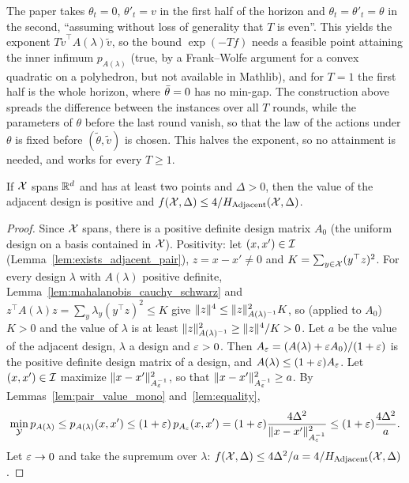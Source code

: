 \begin{remark}
  \label{rem:opt_lower_route}
  The paper takes $\theta_t = 0$, $\theta'_t = v$ in the first half of the horizon and
  $\theta_t = \theta'_t = \theta$ in the second, ``assuming without loss of generality that $T$ is
  even''. This yields the exponent $T \tilde v^\top A(\lambda) \tilde v$, so the bound
  $\exp(-T f)$ needs a feasible point attaining the inner infimum $p_{A(\lambda)}$ (true, by a
  Frank--Wolfe argument for a convex quadratic on a polyhedron, but not available in Mathlib), and
  for $T = 1$ the first half is the whole horizon, where $\bar{\theta} = 0$ has no min-gap. The
  construction above spreads the difference between the instances over all $T$ rounds, while the
  parameters of $\theta$ before the last round vanish, so that the law of the actions under
  $\theta$ is fixed before $(\tilde\theta, \tilde v)$ is chosen. This halves the exponent, so no
  attainment is needed, and works for every $T \ge 1$.
\end{remark}

\begin{lemma}[Bound on $f$]
  \label{lem:opt_value_le}
  \leanok
  If $\mathcal{X}$ spans $\mathbb{R}^d$ and has at least two points and $\Delta > 0$, then the value of the adjacent
  design is positive and $f(\mathcal{X}, \Delta) \le 4 / H_{\mathrm{Adjacent}}(\mathcal{X}, \Delta)$.
\end{lemma}

\begin{proof}
  \leanok
  Since $\mathcal{X}$ spans, there is a positive definite design matrix $A_0$ (the uniform design on a basis
  contained in $\mathcal{X}$). Positivity: let $(x, x') \in \mathcal{I}$ (Lemma~\ref{lem:exists_adjacent_pair}),
  $z = x - x' \ne 0$ and $K = \sum_{y \in \mathcal{X}} (y^\top z)^2$. For every design $\lambda$ with
  $A(\lambda)$ positive definite, Lemma~\ref{lem:mahalanobis_cauchy_schwarz} and
  $z^\top A(\lambda) z = \sum_y \lambda_y (y^\top z)^2 \le K$ give
  $\lVert z \rVert^4 \le \lVert z \rVert^2_{A(\lambda)^{-1}} K$, so (applied to $A_0$) $K > 0$ and the value of
  $\lambda$ is at least $\lVert z \rVert^2_{A(\lambda)^{-1}} \ge \lVert z \rVert^4 / K > 0$.
  Let $a$ be the value of the adjacent design, $\lambda$ a design and $\varepsilon > 0$. Then
  $A_\varepsilon = (A(\lambda) + \varepsilon A_0)/(1 + \varepsilon)$ is the positive definite design matrix of a design,
  and $A(\lambda) \le (1 + \varepsilon) A_\varepsilon$. Let $(x, x') \in \mathcal{I}$ maximize
  $\lVert x - x' \rVert^2_{A_\varepsilon^{-1}}$, so that $\lVert x - x' \rVert^2_{A_\varepsilon^{-1}} \ge a$. By
  Lemmas~\ref{lem:pair_value_mono} and~\ref{lem:equality},
  \[
    \min_{\mathcal{Y}} p_{A(\lambda)} \le p_{A(\lambda)}(x, x') \le (1 + \varepsilon)\, p_{A_\varepsilon}(x, x')
    = (1 + \varepsilon) \frac{4 \Delta^2}{\lVert x - x' \rVert^2_{A_\varepsilon^{-1}}}
    \le (1 + \varepsilon) \frac{4\Delta^2}{a}.
  \]
  Let $\varepsilon \to 0$ and take the supremum over $\lambda$: $f(\mathcal{X}, \Delta) \le 4\Delta^2 / a = 4 /
  H_{\mathrm{Adjacent}}(\mathcal{X}, \Delta)$.
\end{proof}

